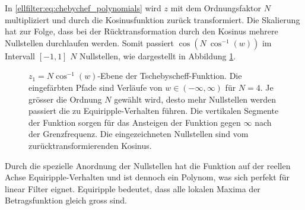 In \eqref{ellfilter:eq:chebychef_polynomials} wird $z$ mit dem Ordnungsfaktor $N$ multipliziert und durch die Kosinusfunktion zurück transformiert.
Die Skalierung hat zur Folge, dass bei der Rücktransformation durch den Kosinus mehrere Nullstellen durchlaufen werden.
Somit passiert $\cos( N~\cos^{-1}(w))$ im Intervall $[-1, 1]$ $N$ Nullstellen, wie dargestellt in Abbildung \ref{ellfilter:fig:arccos2}.
\begin{figure}
    \centering
    
    \caption{
        $z_1=N \cos^{-1}(w)$-Ebene der Tschebyscheff-Funktion.
        Die eingefärbten Pfade sind Verläufe von $w\in(-\infty, \infty)$ für $N = 4$.
        Je grösser die Ordnung $N$ gewählt wird, desto mehr Nullstellen werden passiert die zu Equiripple-Verhalten führen.
        Die vertikalen Segmente der Funktion sorgen für das Ansteigen der Funktion gegen $\infty$ nach der Grenzfrequenz.
        Die eingezeichneten Nullstellen sind vom zurücktransformierenden Kosinus.
    }
    \label{ellfilter:fig:arccos2}
\end{figure}
Durch die spezielle Anordnung der Nullstellen hat die Funktion auf der reellen Achse Equiripple-Verhalten und ist dennoch ein Polynom, was sich perfekt für linear Filter eignet.
Equiripple bedeutet, dass alle lokalen Maxima der Betragsfunktion gleich gross sind.
